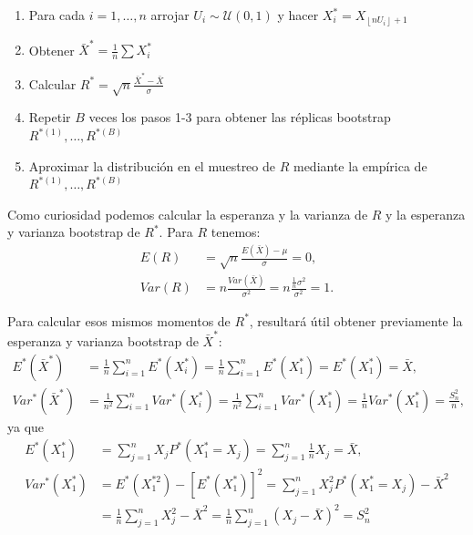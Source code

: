 \documentclass[]{book}
\theoremstyle{definition}
\theoremstyle{definition}
\theoremstyle{definition}
\theoremstyle{remark}
\begin{document}
\begin{enumerate}
\def\labelenumi{\arabic{enumi}.}
\item
  Para cada \(i=1,\ldots ,n\) arrojar
  \(U_i\sim \mathcal{U}\left( 0,1 \right)\) y hacer
  \(X_i^{\ast}=X_{\left\lfloor nU_i\right\rfloor +1}\)
\item
  Obtener \(\bar{X}^{\ast}=\frac{1}{n}\sum X_i^{\ast}\)
\item
  Calcular \(R^{\ast}=\sqrt{n}\frac{\bar{X}^{\ast}-\bar{X}}{ \sigma }\)
\item
  Repetir \(B\) veces los pasos 1-3 para obtener las réplicas bootstrap
  \(R^{\ast (1)}, \ldots, R^{\ast (B)}\)
\item
  Aproximar la distribución en el muestreo de \(R\) mediante la empírica
  de \(R^{\ast (1)}, \ldots, R^{\ast (B)}\)
\end{enumerate}

Como curiosidad podemos calcular la esperanza y la varianza de \(R\) y
la esperanza y varianza bootstrap de \(R^{\ast}\). Para \(R\) tenemos:
\[\begin{aligned}
E\left( R \right) &=\sqrt{n}\frac{E\left( \bar{X} \right) -\mu }{\sigma }
=0, \\
Var\left( R \right) &=n\frac{Var\left( \bar{X} \right)}{\sigma^2}=n
\frac{\frac{1}{n}\sigma^2}{\sigma^2}=1.
\end{aligned}\]

Para calcular esos mismos momentos de \(R^{\ast}\), resultará útil
obtener previamente la esperanza y varianza bootstrap de
\(\bar{X}^{\ast}\): \[\begin{aligned}
E^{\ast}\left( \bar{X}^{\ast} \right) &= \frac{1}{n}
\sum_{i=1}^{n}E^{\ast}\left( X_i^{\ast} \right) =\frac{1}{n}
\sum_{i=1}^{n}E^{\ast}\left( X_1^{\ast} \right) =E^{\ast}\left(
X_1^{\ast} \right) =\bar{X}, \\
Var^{\ast}\left( \bar{X}^{\ast} \right) &= \frac{1}{n^2}
\sum_{i=1}^{n}Var^{\ast}\left( X_i^{\ast} \right) =\frac{1}{n^2}
\sum_{i=1}^{n}Var^{\ast}\left( X_1^{\ast} \right) =\frac{1}{n}Var^{\ast
}\left( X_1^{\ast} \right) =\frac{S_n^2}{n},
\end{aligned}\] ya que \[\begin{aligned}
E^{\ast}\left( X_1^{\ast} \right) &= \sum_{j=1}^{n}X_jP^{\ast}\left(
X_1^{\ast}=X_j \right) =\sum_{j=1}^{n}\frac{1}{n}X_j=\bar{X}, \\
Var^{\ast}\left( X_1^{\ast} \right) &= E^{\ast}\left( X_1^{\ast
2} \right) -\left[ E^{\ast}\left( X_1^{\ast} \right) \right]
^2=\sum_{j=1}^{n}X_j^2P^{\ast}\left( X_1^{\ast}=X_j \right) -\bar{X}
^2 \\
&= \frac{1}{n}\sum_{j=1}^{n}X_j^2-\bar{X}^2=\frac{1}{n}
\sum_{j=1}^{n}\left( X_j-\bar{X} \right)^2=S_n^2
\end{aligned}\]
\end{document}
